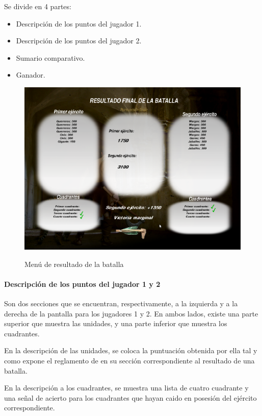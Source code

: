 Se divide en 4 partes:
\begin{itemize}
\item Descripción de los puntos del jugador 1.
\item Descripción de los puntos del jugador 2.
\item Sumario comparativo.
\item Ganador.
\end{itemize}

\begin{figure}[h]
\centering
\includegraphics[scale=.4]{./imagenes/resultado.png}
\label{fig:imgresultado}
\caption{Menú de resultado de la batalla}
\end{figure}


\paragraph{Descripción de los puntos del jugador 1 y 2}
Son dos secciones que se encuentran, respectivamente, a la izquierda y
a la derecha de la pantalla para los jugadores 1 y 2. En ambos lados,
existe una parte superior que muestra las unidades, y una parte
inferior que muestra los cuadrantes.

En la descripción de las unidades, se coloca la puntuación obtenida
por ella tal y como expone el reglamento de \gom en su sección
correspondiente al resultado de una batalla.

En la descripción a los cuadrantes, se muestra una lista de cuatro
cuadrante y una señal de acierto para los cuadrantes que hayan caido
en posesión del ejército correspondiente.

